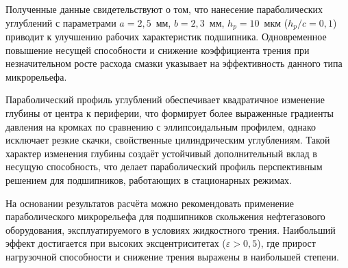 Полученные данные свидетельствуют о том, что нанесение параболических углублений с параметрами $a = 2{,}5$~мм, $b = 2{,}3$~мм, $h_p = 10$~мкм ($h_p/c = 0{,}1$) приводит к улучшению рабочих характеристик подшипника. Одновременное повышение несущей способности и снижение коэффициента трения при незначительном росте расхода смазки указывает на эффективность данного типа микрорельефа.

Параболический профиль углублений обеспечивает квадратичное изменение глубины от центра к периферии, что формирует более выраженные градиенты давления на кромках по сравнению с эллипсоидальным профилем, однако исключает резкие скачки, свойственные цилиндрическим углублениям. Такой характер изменения глубины создаёт устойчивый дополнительный вклад в несущую способность, что делает параболический профиль перспективным решением для подшипников, работающих в стационарных режимах.

На основании результатов расчёта можно рекомендовать применение параболического микрорельефа для подшипников скольжения нефтегазового оборудования, эксплуатируемого в условиях жидкостного трения. Наибольший эффект достигается при высоких эксцентриситетах ($\varepsilon > 0{,}5$), где прирост нагрузочной способности и снижение трения выражены в наибольшей степени.
